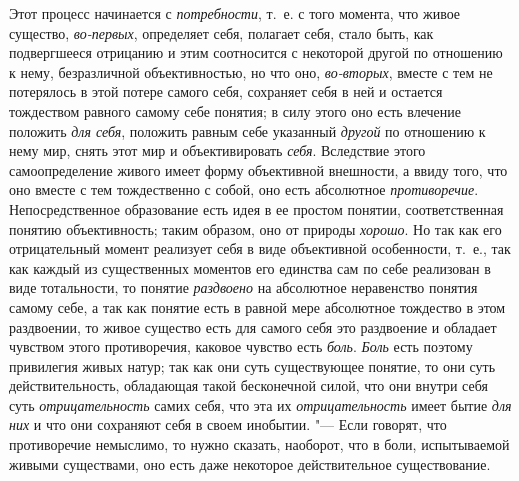 {{Этот процесс начинается с
{\em потребности}, т.~е.
с того момента, что живое существо,
{\em во-первых},
определяет себя, полагает себя, стало быть, как подвергшееся
отрицанию и этим соотносится с некоторой другой по отношению к нему,
безразличной объективностью, но что оно,
{\em во-вторых}, вместе с
тем не потерялось в этой потере самого себя, сохраняет себя в ней и
остается тождеством равного самому себе понятия; в силу этого оно есть
влечение положить {\em для себя},
положить равным себе указанный
{\em другой} по отношению
к нему мир, снять этот мир и объективировать
{\em себя}. Вследствие
этого самоопределение живого имеет форму объективной внешности, а ввиду
того, что оно вместе с тем тождественно с собой, оно есть абсолютное
{\em противоречие}.
Непосредственное образование есть идея в ее простом понятии,
соответственная понятию объективность; таким образом, оно от природы
{\em хорошо}. Но так как
его отрицательный момент реализует себя в виде объективной особенности,
т.~е., так как каждый из существенных моментов его единства сам по себе
реализован в виде тотальности, то понятие
{\em раздвоено} на
абсолютное неравенство понятия самому себе, а так как понятие есть в равной
мере абсолютное тождество в этом раздвоении, то живое существо есть для
самого себя это раздвоение и обладает чувством этого противоречия, каковое
чувство есть {\em боль}.
{\em Боль} есть поэтому
привилегия живых натур; так как они суть существующее понятие, то они суть
действительность, обладающая такой бесконечной силой, что они внутри себя
суть {\em отрицательность}
самих себя, что эта их
{\em отрицательность}
имеет бытие {\em для них}
и что они сохраняют себя в своем инобытии. "---
Если говорят, что противоречие немыслимо, то нужно сказать,
наоборот, что в боли, испытываемой живыми существами, оно есть даже
некоторое действительное существование.

}}
